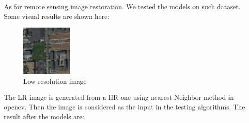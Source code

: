 \documentclass[10pt,twocolumn,letterpaper]{article}
\begin{document}
As for remote sensing image restoration.
We tested the models on such dataset. 
Some visual results are shown here:
\begin{figure}[H]
    \centering
    \includegraphics[width=1in]{images/rs_LR.png}
    \caption{Low resolution image}
\end{figure}
The LR image is generated from a HR one using nearest Neighbor method in opencv.
Then the image is considered as the input in the testing algorithms.
The result after the models are:
\begin{figure}[H]
    \centering


\end{figure}
\end{document}
